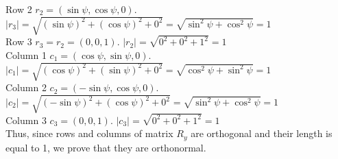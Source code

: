 \documentclass[a4paper, twoside, english]{article}
\begin{document}
{Row 2 $r_2=(\sin \psi , \cos \psi, 0 )$. ${|r_3|}={\sqrt{(\sin\psi)^2+(\cos \psi)^2 +0^2}}={\sqrt{ \sin^2 \psi + \cos^2 \psi}} = 1$\\
{Row 3 $r_3=r_2=(0,0,1 )$. ${|r_2|}={\sqrt{0^2+0^2+1^2}} = 1$}\\
{Column 1 $c_1=(\cos \psi, \sin \psi, 0)$. ${{|c_1|}={\sqrt{(\cos\psi)^2+(\sin \psi)^2+0^2}}={\sqrt{ \cos^2 \psi + \sin^2 \psi}}=1}$}\\
{Column 2 $c_2=(-\sin \psi , \cos \psi, 0 )$. ${|c_2|}={\sqrt{(-\sin\psi)^2+(\cos \psi)^2 +0^2}}={\sqrt{ \sin^2 \psi + \cos^2 \psi}} = 1$}\\
{Column 3 $c_3=(0,0,1 )$. ${|c_3|}={\sqrt{0^2+0^2+1^2}} = 1$}\\
Thus, since rows and columns of matrix $R_y$ are orthogonal and their length is equal to 1, we prove that they are orthonormal.

}
\end{document}
